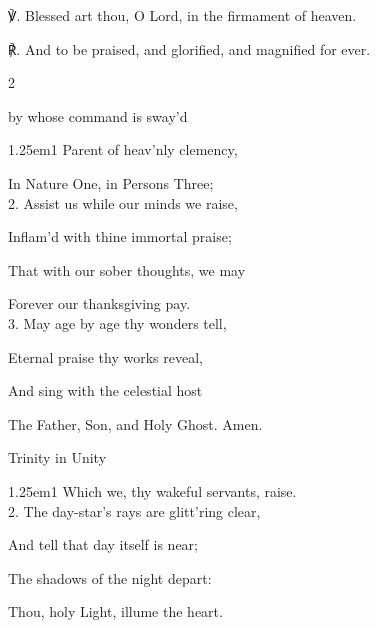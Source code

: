 ℣. Blessed art thou, O Lord, in the firmament of heaven.

℟. And to be praised, and glorified, and magnified for ever.


\mattins
{}

\begin{paracol}{2}
\sloppy

\mattinsInvitatoryHymn
{} by whose command is sway'd

\begin{hangparas}{1.25em}{1}
Parent of heav'nly clemency,

In Nature One, in Persons Three;\\

2. Assist us while our minds we raise,

Inflam'd with thine immortal praise;

That with our sober thoughts, we may

Forever our thanksgiving pay.\\

3. May age by age thy wonders tell,

Eternal praise thy works reveal,

And sing with the celestial host

The Father, Son, and Holy Ghost. Amen.
\end{hangparas}

\switchcolumn

\mattinsOfficeHymn
{} Trinity in Unity


\begin{hangparas}{1.25em}{1}
Which we, thy wakeful servants, raise.\\

2. The day-star's rays are glitt'ring clear,

And tell that day itself is near;

The shadows of the night depart:

Thou, holy Light, illume the heart.\\


\end{hangparas}
\end{paracol}
